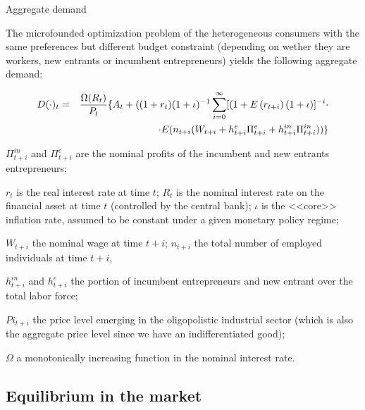 \documentclass[9pt]{beamer}
\begin{document}
\begin{frame}{Aggregate demand}

The microfounded optimization problem of the heterogeneous consumers with the same preferences but different budget constraint (depending on wether they are workers, new entrants or incumbent entrepreneurs) yields the following aggregate demand:

\begin{eqnarray}
D(\cdot )_{t} &=&\frac{\Omega (R_{t})}{P_{t}}\{A_{t}+((1+r_{t})(1+\iota
)^{-1}\sum_{i=0}^{\infty }[(1+E\left( r_{t+i}\right) (1+\iota )]^{-i}\cdot 
\notag \\
&&\cdot E(n_{t+i}(W_{t+i}+h_{t+i}^{e}\Pi _{t+i}^{e}+h_{t+i}^{in}\Pi
_{t+i}^{in}))\}  \label{per capita distrib cons_1}
\end{eqnarray}

\small

$\Pi_{t+i}^{in}$ and $\Pi _{t+i}^{e}$ are the nominal profits of the incumbent and new entrants entrepreneurs;

$r_{t}$ is  the real interest rate at time $t$; $R_{t}$ is the nominal interest rate on the financial asset at time $t$ (controlled by the central bank); $\iota$ is the <<core>> inflation rate, assumed to be constant under a given monetary policy regime;

$W_{t+i}$ the nominal wage at time $t+i$; $n_{t+i}$ the total number of employed individuals at time $t+i$,

$h_{t+i}^{in}$ and $h_{t+i}^{e}$ the portion of incumbent entrepreneurs and new entrant over the total labor force;

$Pi _{t+i}$ the price level emerging in the oligopolistic industrial sector (which is also the aggregate price level since we have an indifferentiated good);

$\Omega$ a monotonically increasing function in the nominal interest rate.

\end{frame}




\subsection{Equilibrium in the market}
\end{document}

